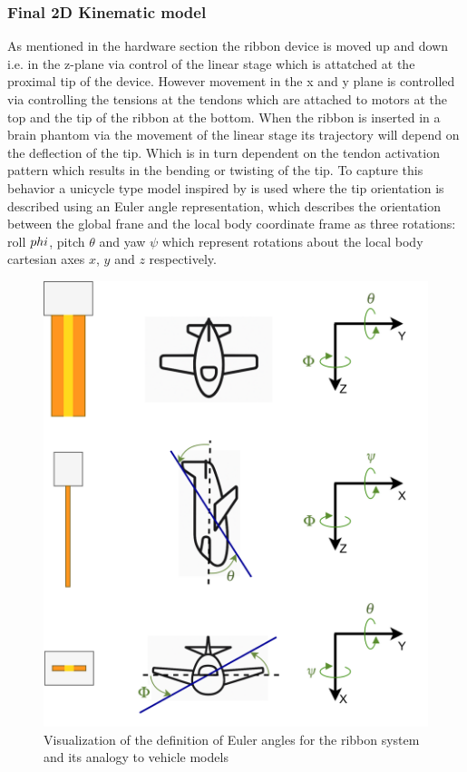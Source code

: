 \subsubsection{Final 2D Kinematic model}
As mentioned in the hardware section the ribbon device is moved up and down i.e. in the z-plane via control of the linear stage which is attatched at the proximal tip of the device. However movement in the x and y plane is controlled via controlling the tensions at the tendons which are attached to motors at the top and the tip of the ribbon at the bottom. When the ribbon is inserted in a brain phantom via the movement of the linear stage its trajectory will depend on the deflection of the tip. Which is in turn dependent on the tendon activation pattern which results in the bending or twisting of the tip. 
\newline \newline
To capture this behavior a unicycle type model inspired by \cite{ko_two-dimensional_2010} is used where the tip orientation is described using an Euler angle representation, which describes the orientation between the global frane and the local body coordinate frame as three rotations: roll \(\\phi\), pitch \(\theta\) and yaw \(\psi\) which represent rotations about the local body cartesian axes \(x\), \(y\) and \(z\) respectively.

\begin{figure} [H]
    \centering
    \includegraphics[width=0.7\linewidth]{images/planes.png}
    \caption{Visualization of the definition of Euler angles for the ribbon system and its analogy to vehicle models}
    \label{fig:planes}
\end{figure}


